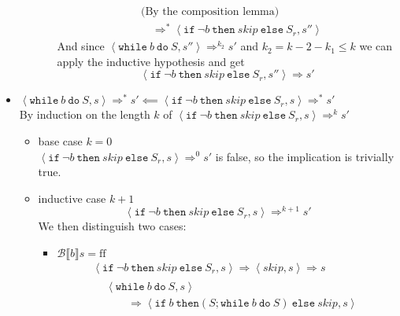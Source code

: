 \begin{exercise}
\begin{itemize}
\begin{itemize}
\begin{itemize}
\begin{align*}
                            \\&\text{(By the composition lemma)}
                            \\&\quad\Rightarrow^* \left<\texttt{if}\ \neg b\ \texttt{then}\ skip\ \texttt{else}\ S_r, s''\right>
                        \end{align*}
                        And since $\left<\texttt{while}\ b\ \texttt{do}\ S, s''\right> \Rightarrow^{k_2} s'$ and $k_2 = k - 2 - k_1 \leq k$  we can apply the inductive hypothesis and get
                        \[ \left<\texttt{if}\ \neg b\ \texttt{then}\ skip\ \texttt{else}\ S_r, s''\right> \Rightarrow s' \]
                \end{itemize}
            \end{itemize}
        \item $\left<\texttt{while}\ b\ \texttt{do}\ S, s\right> \Rightarrow^* s' \impliedby \left<\texttt{if}\ \neg b\ \texttt{then}\ skip\ \texttt{else}\ S_r, s\right> \Rightarrow^* s'$ \\
            By induction on the length $k$ of $\left<\texttt{if}\ \neg b\ \texttt{then}\ skip\ \texttt{else}\ S_r, s\right> \Rightarrow^k s'$
            \begin{itemize}
                \item base case $k=0$ \\
                $\left<\texttt{if}\ \neg b\ \texttt{then}\ skip\ \texttt{else}\ S_r, s\right> \Rightarrow^0 s'$ is false, so the implication is trivially true.
                \item inductive case $k+1$ \vspace*{-0.3cm}
                \[ \left<\texttt{if}\ \neg b\ \texttt{then}\ skip\ \texttt{else}\ S_r, s\right> \Rightarrow^{k+1} s' \]
                We then distinguish two cases:
                \begin{itemize}
                    \item $\mathcal{B} \llbracket b \rrbracket s = \text{ff}$
                    \begin{gather*}
                        \left<\texttt{if}\ \neg b\ \texttt{then}\ skip\ \texttt{else}\ S_r, s\right>
                        \Rightarrow
                        \left<skip, s\right>
                        \Rightarrow s
                        \\
                        \begin{align*}
                            &\left<\texttt{while}\ b\ \texttt{do}\ S, s\right>
                            \\&\qquad\Rightarrow \left<\texttt{if}\ b\ \texttt{then} (S; \texttt{while}\ b\ \texttt{do}\ S)\ \texttt{else}\ skip, s\right>

\end{align*}
\end{gather*}
\end{itemize}
\end{itemize}
\end{itemize}
\end{exercise}
